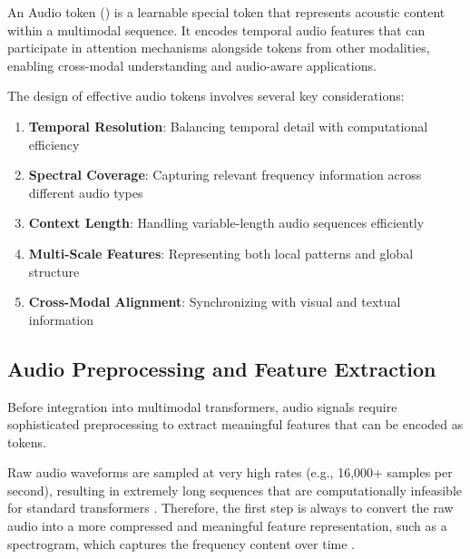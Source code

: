\begin{definition}
An Audio token () is a learnable special token that represents acoustic content within a multimodal sequence. It encodes temporal audio features that can participate in attention mechanisms alongside tokens from other modalities, enabling cross-modal understanding and audio-aware applications.
\end{definition}

The design of effective audio tokens involves several key considerations:

\begin{enumerate}
\item \textbf{Temporal Resolution}: Balancing temporal detail with computational efficiency
\item \textbf{Spectral Coverage}: Capturing relevant frequency information across different audio types
\item \textbf{Context Length}: Handling variable-length audio sequences efficiently
\item \textbf{Multi-Scale Features}: Representing both local patterns and global structure
\item \textbf{Cross-Modal Alignment}: Synchronizing with visual and textual information
\end{enumerate}

\subsection{Audio Preprocessing and Feature Extraction}

Before integration into multimodal transformers, audio signals require sophisticated preprocessing to extract meaningful features that can be encoded as tokens.

Raw audio waveforms are sampled at very high rates (e.g., 16,000+ samples per second), resulting in extremely long sequences that are computationally infeasible for standard transformers \citep{baevski2020wav2vec}. Therefore, the first step is always to convert the raw audio into a more compressed and meaningful feature representation, such as a spectrogram, which captures the frequency content over time \citep{kong2020diffwave, conneau2020unsupervised}.

